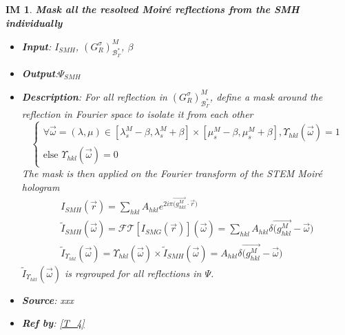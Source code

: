 \documentclass[12pt]{article}
\newtheorem{IM}{IM}
\begin{document}
\begin{IM}
\label{IM_4}
\noindent\colorbox{shadecolorIM}{\normalfont \textbf{Mask all the resolved Moir{\'e} reflections from the SMH individually}}
\normalfont
\begin{itemize}
\item \textbf{Input}: $I_{SMH}$, $(G^{\sigma}_{R})^{M}_{\mathcal{B}_{\Gamma}^{*}}$, $\beta$
\item \textbf{Output}:$\Psi_{SMH}$
\item \textbf{Description}: For all reflection in $(G^{\sigma}_{R})^{M}_{\mathcal{B}_{\Gamma}^{*}}$, define a mask around the reflection in Fourier space to isolate it from each other
\begin{equation}
\begin{cases}
\forall \vec{\omega} = (\lambda, \mu) \in [\lambda_{s}^{M}-\beta, \lambda_{s}^{M}+\beta]\times [\mu_{s}^{M}-\beta, \mu_{s}^{M}+\beta], \Upsilon_{hkl}(\vec{\omega}) = 1   \\
\text{else } \Upsilon_{hkl}(\vec{\omega}) = 0
\end{cases}
\end{equation}
The mask is then applied on the Fourier transform of the  STEM Moir{\'e} hologram
\begin{equation}
\begin{gathered}
I_{SMH}(\vec{r})= \sum_{hkl}A_{hkl}e^{2i\pi \overrightarrow{(g_{hkl}^{M}} \cdot \overrightarrow{r})} \\
\tilde{I}_{SMH}(\vec{\omega}) = \mathcal{FT}[I_{SMG}(\vec{r})](\vec{\omega})  = \sum_{hkl}A_{hkl}\delta{\overrightarrow{(g_{hkl}^{M}}} -\overrightarrow{\omega}) \\
\tilde{I}_{\Upsilon_{hkl}}(\vec{\omega})=\Upsilon_{hkl}(\vec{\omega}) \times  \tilde{I}_{SMH}(\vec{\omega})= A_{hkl}\delta{\overrightarrow{(g_{hkl}^{M}}} -\overrightarrow{\omega})
\end{gathered}
\end{equation}
$\tilde{I}_{\Upsilon_{hkl}}(\vec{\omega})$ is regrouped for all reflections in $\Psi$.
\item \textbf{Source}: xxx
\item \textbf{Ref by}: \cref{T_4}
\end{itemize}
\end{IM}
\end{document}
